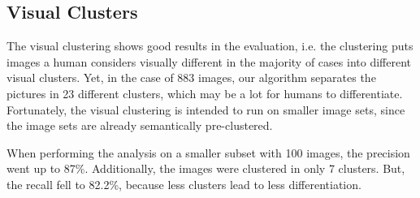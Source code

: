 \subsection{Visual Clusters}

The visual clustering shows good results in the evaluation, i.e. the clustering puts images a human considers visually different in the majority of cases into different visual clusters. Yet, in the case of 883 images, our algorithm separates the pictures in 23 different clusters, which may be a lot for humans to differentiate. Fortunately, the visual clustering is intended to run on smaller image sets, since the image sets are already semantically pre-clustered. 

\bigskip
When performing the analysis on a smaller subset with 100 images, the precision went up to 87\%. Additionally, the images were clustered in only 7 clusters. But, the recall fell to 82.2\%, because less clusters lead to less differentiation. 

